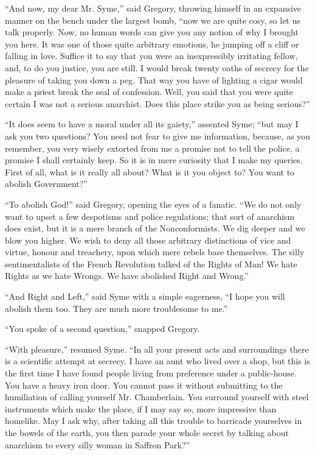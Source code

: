 \documentclass{book}
\begin{document}
“And now, my dear Mr. Syme,” said Gregory, throwing himself in an expansive manner on the bench under the largest bomb, “now we are quite cosy, so let us talk properly. Now, no human words can give you any notion of why I brought you here. It was one of those quite arbitrary emotions, he jumping off a cliff or falling in love. Suffice it to say that you were an inexpressibly irritating fellow, and, to do you justice, you are still. I would break twenty oaths of secrecy for the pleasure of taking you down a peg. That way you have of lighting a cigar would make a priest break the seal of confession. Well, you said that you were quite certain I was not a serious anarchist. Does this place strike you as being serious?”

“It does seem to have a moral under all its gaiety,” assented Syme; “but may I ask you two questions? You need not fear to give me information, because, as you remember, you very wisely extorted from me a promise not to tell the police, a promise I shall certainly keep. So it is in mere curiosity that I make my queries. First of all, what is it really all about? What is it you object to? You want to abolish Government?”

“To abolish God!” said Gregory, opening the eyes of a fanatic. “We do not only want to upset a few despotisms and police regulations; that sort of anarchism does exist, but it is a mere branch of the Nonconformists. We dig deeper and we blow you higher. We wish to deny all those arbitrary distinctions of vice and virtue, honour and treachery, upon which mere rebels base themselves. The silly sentimentalists of the French Revolution talked of the Rights of Man! We hate Rights as we hate Wrongs. We have abolished Right and Wrong.”

“And Right and Left,” said Syme with a simple eagerness, “I hope you will abolish them too. They are much more troublesome to me.”

“You spoke of a second question,” snapped Gregory.

“With pleasure,” resumed Syme. “In all your present acts and surroundings there is a scientific attempt at secrecy. I have an aunt who lived over a shop, but this is the first time I have found people living from preference under a public-house. You have a heavy iron door. You cannot pass it without submitting to the humiliation of calling yourself Mr. Chamberlain. You surround yourself with steel instruments which make the place, if I may say so, more impressive than homelike. May I ask why, after taking all this trouble to barricade yourselves in the bowels of the earth, you then parade your whole secret by talking about anarchism to every silly woman in Saffron Park?”
\end{document}
